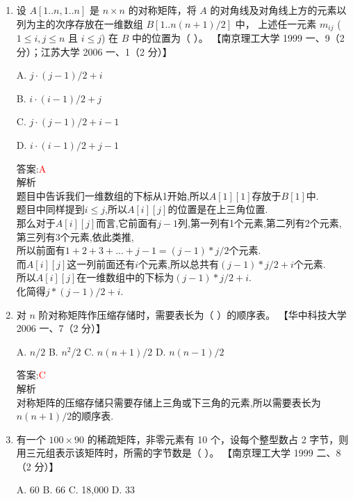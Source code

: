 \documentclass[lang=cn,newtx,10pt,scheme=chinese]{../elegantbook}
\begin{document}
\begin{enumerate}
    
    


    \item 设 $A[1..n,1..n]$ 是 $n \times n$ 的对称矩阵，将 $A$ 的对角线及对角线上方的元素以列为主的次序存放在一维数组 $B[1..n(n+1)/2]$ 中，
    上述任一元素 $m_{ij}$ ($1 \leq i, j \leq n$ 且 $i \leq j$) 在 $B$ 中的位置为（ ）。  
    【南京理工大学 1999 一、9（2 分）；江苏大学 2006 一、1（2 分）】 

    A. $j \cdot (j-1)/2 + i$  

    B. $i \cdot (i-1)/2 + j$  

    C. $j \cdot (j-1)/2 + i - 1$  

    D. $i \cdot (i-1)/2 + j - 1$  

    答案:\textcolor{red}{A}\\
    解析\\
    题目中告诉我们一维数组的下标从1开始,所以$A[1][1]$存放于$B[1]$中.\\
    题目中同样提到$i \leq j$,所以$A[i][j]$的位置是在上三角位置.\\
    那么对于$A[i][j]$而言,它前面有$j-1$列,第一列有1个元素,第二列有2个元素,第三列有3个元素,依此类推,\\
    所以前面有$1+2+3+...+j-1=(j-1)*j/2$个元素.\\
    而$A[i][j]$这一列前面还有$i$个元素,所以总共有$(j-1)*j/2+i$个元素.\\
    所以$A[i][j]$在一维数组中的下标为$(j-1)*j/2+i$.\\
    化简得$j*(j-1)/2+i$.\\
    

    \item 对 $n$ 阶对称矩阵作压缩存储时，需要表长为（ ）的顺序表。  
    【华中科技大学 2006 一、7（2 分）】  

    A. $n/2$ \quad B. $n^2/2$ \quad C. $n(n+1)/2$ \quad D. $n(n-1)/2$  

    答案:\textcolor{red}{C}\\
    解析\\
    对称矩阵的压缩存储只需要存储上三角或下三角的元素,所以需要表长为$n(n+1)/2$的顺序表.\\
    
    

    \item 有一个 $100 \times 90$ 的稀疏矩阵，非零元素有 10 个，设每个整型数占 2 字节，则用三元组表示该矩阵时，所需的字节数是（ ）。  
    【南京理工大学 1999 二、8（2 分）】  

    A. 60 \quad B. 66 \quad C. 18,000 \quad D. 33 


\end{enumerate}
\end{document}
